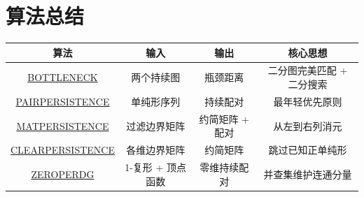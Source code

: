 \documentclass[UTF8]{ctexart}
\begin{document}
\section*{算法总结}

\begin{center}
\begin{tabular}{|c|c|c|c|}
\hline
\textbf{算法} & \textbf{输入} & \textbf{输出} & \textbf{核心思想} \\
\hline
\hyperref[alg:bottleneck]{BOTTLENECK} & 两个持续图 & 瓶颈距离 & 二分图完美匹配 + 二分搜索 \\
\hline
\hyperref[alg:pairpersistence]{PAIRPERSISTENCE} & 单纯形序列 & 持续配对 & 最年轻优先原则 \\
\hline
\hyperref[alg:matpersistence]{MATPERSISTENCE} & 过滤边界矩阵 & 约简矩阵 + 配对 & 从左到右列消元 \\
\hline
\hyperref[alg:clearpersistence]{CLEARPERSISTENCE} & 各维边界矩阵 & 约简矩阵 & 跳过已知正单纯形 \\
\hline
\hyperref[alg:zeroperdg]{ZEROPERDG} & 1-复形 + 顶点函数 & 零维持续配对 & 并查集维护连通分量 \\
\hline
\end{tabular}
\end{center}
\end{document}
